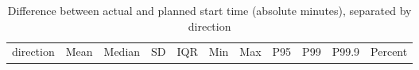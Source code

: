 \documentclass[
]{article}
\begin{document}
\begin{longtable}[]{@{}
  >{\centering\arraybackslash}p{}
  >{\centering\arraybackslash}p{}
  >{\centering\arraybackslash}p{}
  >{\centering\arraybackslash}p{}
  >{\centering\arraybackslash}p{}
  >{\centering\arraybackslash}p{}
  >{\centering\arraybackslash}p{}
  >{\centering\arraybackslash}p{}
  >{\centering\arraybackslash}p{}
  >{\centering\arraybackslash}p{}
  >{\centering\arraybackslash}p{}@{}}
\caption{Difference between actual and planned start time (absolute
minutes), separated by direction \label{tab:start_diff}}\tabularnewline
\toprule\noalign{}
\begin{minipage}[b]{\linewidth}\centering
direction
\end{minipage} & \begin{minipage}[b]{\linewidth}\centering
Mean
\end{minipage} & \begin{minipage}[b]{\linewidth}\centering
Median
\end{minipage} & \begin{minipage}[b]{\linewidth}\centering
SD
\end{minipage} & \begin{minipage}[b]{\linewidth}\centering
IQR
\end{minipage} & \begin{minipage}[b]{\linewidth}\centering
Min
\end{minipage} & \begin{minipage}[b]{\linewidth}\centering
Max
\end{minipage} & \begin{minipage}[b]{\linewidth}\centering
P95
\end{minipage} & \begin{minipage}[b]{\linewidth}\centering
P99
\end{minipage} & \begin{minipage}[b]{\linewidth}\centering
P99.9
\end{minipage} & \begin{minipage}[b]{\linewidth}\centering
Percent

\end{minipage}
\end{longtable}
\end{document}
